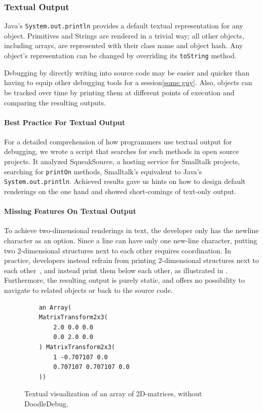 \documentclass[english]{scrartcl}
\newcommand{\println}{\texttt{Sys\-tem.\-out.\-println}\xspace}
\begin{document}
\subsubsection{Textual Output}
Java's \println provides a default textual representation for any object.
Primitives and Strings are rendered in a trivial way; all other objects, including arrays, are represented with their class name and object hash.
Any object's representation can be changed by overriding its \texttt{toString} method.

Debugging by directly writing into source code may be easier and quicker than having to equip other debugging tools for a session\ref{some guy}.
Also, objects can be tracked over time by printing them at different points of execution and comparing the resulting outputs.

\paragraph{Best Practice For Textual Output}
For a detailed comprehension of how programmers use textual output for debugging, we wrote a script that searches for such methods in open source projects.
It analyzed SqueakSource, a hosting service for Smalltalk projects, searching for \texttt{printOn} methods, Smalltalk's equivalent to Java's \println.
Achieved results\cite{first_dd-paper} gave us hints on how to design default renderings on the one hand and showed short-comings of text-only output.

\paragraph{Missing Features On Textual Output}
To achieve two-dimensional renderings in text, the developer only has the newline character as an option.
Since a line can have only one new-line character, putting two 2-dimensional structures next to each other requires coordination. In practice, developers instead refrain from printing 2-dimensional structures next to each other~\cite{Schw11b}, and instead print them below each other, as illustrated in .
Furthermore, the resulting output is purely static, and offers no possibility to navigate to related objects or back to the source code.

\begin{figure}[h]
	\begin{lstlisting}
	an Array(
	MatrixTransform2x3(
		2.0 0.0 0.0
		0.0 2.0 0.0
	) MatrixTransform2x3(
		1 -0.707107 0.0
		0.707107 0.707107 0.0
	))
	\end{lstlisting}
	\caption{Textual visualization of an array of 2D-matrices, without DoodleDebug.}
\end{figure}
\end{document}
